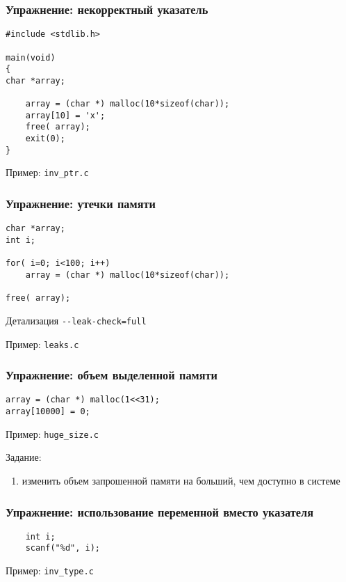 \begin{frame}[fragile]
	\frametitle{Упражнение: некорректный указатель}

	\begin{lstlisting}
#include <stdlib.h>

main(void)
{
char *array;

    array = (char *) malloc(10*sizeof(char));
    array[10] = 'x';
    free( array);
    exit(0);
}
	\end{lstlisting}

	Пример: {\tt inv\_ptr.c}

\end{frame}

\begin{frame}[fragile]
	\frametitle{Упражнение: утечки памяти}

	\begin{lstlisting}
char *array;
int i;

for( i=0; i<100; i++)
    array = (char *) malloc(10*sizeof(char));

free( array);
	\end{lstlisting}

	\begin{block}{Детализация}
		{\tt -{}-leak-check=full}
	\end{block}

	Пример: {\tt leaks.c}

\end{frame}

\begin{frame}[fragile]
	\frametitle{Упражнение: объем выделенной памяти}

	\begin{lstlisting}
array = (char *) malloc(1<<31);
array[10000] = 0;
	\end{lstlisting}

	Пример: {\tt huge\_size.c}
	
	\bigskip
	\pause

	Задание:
	\begin{enumerate}
		\item изменить объем запрошенной памяти на больший, чем доступно в системе
	\end{enumerate}

\end{frame}

\begin{frame}[fragile]
	\frametitle{Упражнение: использование переменной вместо указателя}

	\begin{lstlisting}
    int i;
    scanf("%d", i);
	\end{lstlisting}

	Пример: {\tt inv\_type.c}
\end{frame}

